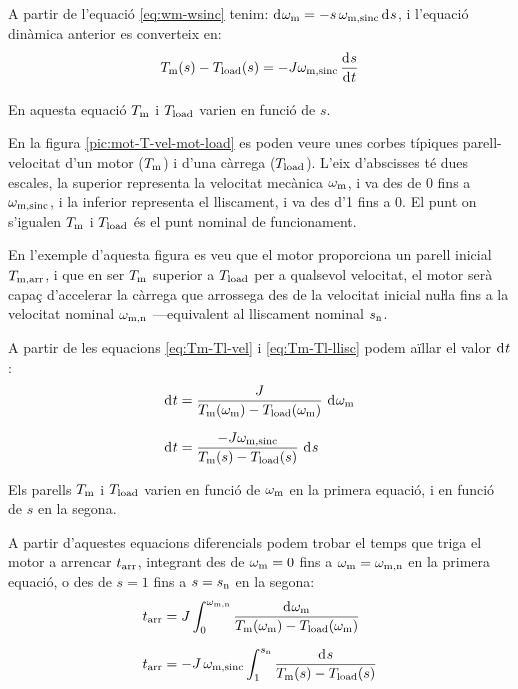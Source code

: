 A partir de l'equació \eqref{eq:wm-wsinc} tenim: $\diff \omega\ped{m} = -s\,\omega\ped{m,sinc} \diff s$, i l'equació dinàmica anterior es converteix en:
\begin{equation}\label{eq:Tm-Tl-llisc}
    T\ped{m}(s) - T\ped{load}(s) = -J \omega\ped{m,sinc}\,\frac{\diff s}{\diff t}
\end{equation}

En aquesta equació $T_\mathrm{m}$ i $T_\mathrm{load}$ varien en funció de $s$.


En la figura \vref{pic:mot-T-vel-mot-load} es poden veure unes corbes típiques parell-velocitat d'un motor ($T_\mathrm{m}$) i d'una  càrrega ($T_\mathrm{load}$). L'eix d'abscisses té dues escales, la superior representa la velocitat mecànica $\omega_\mathrm{m}$, i va des de 0 fins a $\omega_\mathrm{m,sinc}$, i la inferior representa el lliscament, i va des d'1 fins a 0. El punt on s'igualen $T_\mathrm{m}$ i $T_\mathrm{load}$ és el punt nominal de funcionament.

En l'exemple d'aquesta figura es veu que el motor proporciona un parell inicial $T_\mathrm{m,arr}$, i que en ser $T_\mathrm{m}$  superior a $T_\mathrm{load}$ per a qualsevol velocitat, el motor serà  capaç d'accelerar la càrrega que arrossega des de la velocitat inicial nuŀla fins a la velocitat nominal $\omega_\mathrm{m,n}$ ---equivalent al lliscament nominal $s_\mathrm{n}$.
\begin{center}
    
    \label{pic:mot-T-vel-mot-load}
\end{center}

A partir de les equacions \eqref{eq:Tm-Tl-vel} i \eqref{eq:Tm-Tl-llisc} podem aïllar el valor $\diff t$:
\begin{subequations}
\begin{align}
    \diff t &= \frac{J}{T\ped{m}(\omega\ped{m})-T\ped{load}(\omega\ped{m})}\,\diff\omega\ped{m}\\[1.5ex]
    \diff t &= \frac{-J \omega\ped{m,sinc}}{T\ped{m}(s)-T\ped{load}(s)}\,\diff s
\end{align}
\end{subequations}

Els parells $T_\mathrm{m}$ i $T_\mathrm{load}$ varien en funció de $\omega_\mathrm{m}$ en la primera equació, i en funció de $s$ en la segona.

A partir d'aquestes equacions diferencials podem trobar el temps que triga el motor a arrencar $t_\mathrm{arr}$, integrant des de $\omega_\mathrm{m}=0$ fins a $\omega_\mathrm{m}=\omega_\mathrm{m,n}$ en la primera equació, o des de $s = 1$ fins a $s = s_\mathrm{n}$ en la segona:
\begin{subequations}
\begin{align}
    t\ped{arr} &= J\int_{0}^{\omega\ped{m,n}} \frac{\diff\omega\ped{m}}{T\ped{m}(\omega\ped{m})-T\ped{load}(\omega\ped{m})}\label{eq:tarr-mot}\\[1.5ex]
    t\ped{arr} &= - J\,\omega\ped{m,sinc} \int_{1}^{s\ped{n}} \frac{\diff s}{T\ped{m}(s)-T\ped{load}(s)}
\end{align}
\end{subequations}

